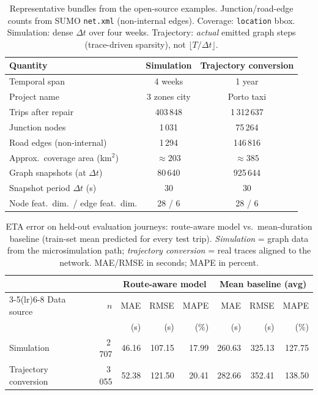 
\begin{table}[t]
\caption{Representative bundles from the open-source examples. Junction/road-edge counts from SUMO \texttt{net.xml} (non-internal edges). Coverage: \texttt{location} bbox. Simulation: dense $\Delta t$ over four weeks. Trajectory: \emph{actual} emitted graph steps (trace-driven sparsity), not $\lfloor T/\Delta t\rfloor$.}
\label{tab:dataset_stats}
\centering
\small
\setlength{\tabcolsep}{4pt}
\begin{tabular}{@{}lcc@{}}
\toprule
Quantity & Simulation & Trajectory conversion \\
\midrule
Temporal span & 4 weeks & 1 year \\
Project name & 3 zones city & Porto taxi \\
Trips after repair & 403\,848 & 1\,312\,637 \\
Junction nodes & 1\,031 & 75\,264 \\
Road edges (non-internal) & 1\,294 & 146\,816 \\
Approx.\ coverage area (km$^2$) & $\approx 203$ & $\approx 385$ \\
Graph snapshots (at $\Delta t$) & 80\,640 & 925\,644 \\
Snapshot period $\Delta t$ (s) & 30 & 30 \\
Node feat.\ dim.\ / edge feat.\ dim. & 28 / 6 & 28 / 6 \\
\bottomrule
\end{tabular}
\end{table}

\begin{table}[t]
\caption{ETA error on held-out evaluation journeys: route-aware model vs.\ mean-duration baseline (train-set mean predicted for every test trip). \emph{Simulation} = graph data from the microsimulation path; \emph{trajectory conversion} = real traces aligned to the network. MAE/RMSE in seconds; MAPE in percent.}
\label{tab:eval_results}
\centering
\small
\setlength{\tabcolsep}{3pt}
\begin{tabular}{@{}l r rrr rrr@{}}
\toprule
 & & \multicolumn{3}{c}{Route-aware model} & \multicolumn{3}{c}{Mean baseline (avg)} \\
\cmidrule(lr){3-5}\cmidrule(lr){6-8}
Data source & $n$ & MAE & RMSE & MAPE & MAE & RMSE & MAPE \\
 & & (s) & (s) & (\%) & (s) & (s) & (\%) \\
\midrule
Simulation & 2\,707 & 46.16 & 107.15 & 17.99 & 260.63 & 325.13 & 127.75 \\
Trajectory conversion & 3\,055 & 52.38 & 121.50 & 20.41 & 282.66 & 352.41 & 138.50 \\
\bottomrule
\end{tabular}
\end{table}
